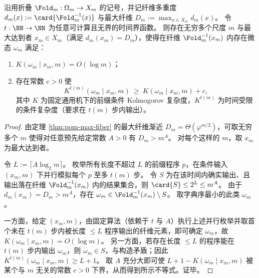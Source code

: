 \begin{theorem}[最大纤维内的全息深度可任意放大]\label{thm:fold-maxfiber-holographic-depth-amplification}
沿用折叠 \(\Fold_m:\Omega_m\to X_m\) 的记号，并记纤维多重度 \(d_m(x):=\card{\Fold_m^{-1}(x)}\) 与最大纤维
\(
D_m:=\max_{x\in X_m}d_m(x)
\)。
令 \(t:\NN\to\NN\) 为任意可计算且无界的时间界函数。
则存在无穷多个尺度 \(m\) 与最大达到者 \(x_m\in X_m\)（满足 \(d_m(x_m)=D_m\)），使得在纤维 \(\Fold_m^{-1}(x_m)\) 内存在微态 \(\omega_m\) 满足：
\begin{enumerate}
  \item \(K(\omega_m\mid x_m,m)=O(\log m)\)；
  \item 存在常数 \(c>0\) 使
  \[
  K^{t(m)}(\omega_m\mid x_m,m)\ \ge\ K(\omega_m\mid x_m,m)+c,
  \]
  其中 \(K\) 为固定通用机下的前缀条件 Kolmogorov 复杂度，\(K^{t(m)}\) 为时间受限的条件复杂度（要求在 \(t(m)\) 步内输出）。
\end{enumerate}
\end{theorem}

\begin{proof}
由定理 \ref{thm:pom-max-fiber} 的最大纤维渐近 \(D_m=\Theta(\varphi^{m/2})\)，可取无穷多个 \(m\) 使得对任意预先给定常数 \(A>0\) 有 \(D_m>m^{A}\)。
对每个这样的 \(m\)，取 \(x_m\) 为最大达到者。
\par
令 \(L:=\lceil A\log_2 m\rceil\)。
枚举所有长度不超过 \(L\) 的前缀程序 \(p\)，在条件输入 \((x_m,m)\) 下并行模拟每个 \(p\) 至多 \(t(m)\) 步。
令 \(S\) 为在该时间内确实输出、且输出落在纤维 \(\Fold_m^{-1}(x_m)\) 内的结果集合，则 \(\card{S}\le 2^{L}\le m^{A}\)。
由于 \(d_m(x_m)=D_m>m^A\)，存在 \(\omega_m\in \Fold_m^{-1}(x_m)\setminus S\)。
取字典序最小的此类 \(\omega_m\)。
\par
一方面，给定 \((x_m,m)\)，由固定算法（依赖于 \(t\) 与 \(A\)）执行上述并行枚举并取首个未在 \(t(m)\) 步内被长度 \(\le L\) 程序输出的纤维元素，即可确定 \(\omega_m\)，故 \(K(\omega_m\mid x_m,m)=O(\log m)\)。
另一方面，若存在长度 \(\le L\) 的程序能在 \(t(m)\) 步内输出 \(\omega_m\)，则 \(\omega_m\in S\)，与构造矛盾；因此 \(K^{t(m)}(\omega_m\mid x_m,m)\ge L+1\)。
取 \(A\) 充分大即可使 \(L+1-K(\omega_m\mid x_m,m)\) 被某个与 \(m\) 无关的常数 \(c>0\) 下界，从而得到所示不等式。证毕。
\end{proof}

